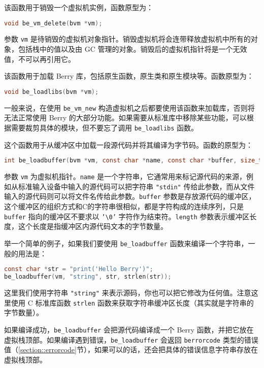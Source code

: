 
该函数用于销毁一个虚拟机实例，函数原型为：
\begin{lstlisting}[language=c, style=berry, numbers=none]
void be_vm_delete(bvm *vm);
\end{lstlisting}
参数 \texttt{vm} 是待销毁的虚拟机对象指针。销毁虚拟机将会连带释放虚拟机中所有的对象，包括栈中的值以及由 GC 管理的对象。销毁后的虚拟机指针将是一个无效值，不可以再引用它。


该函数用于加载 Berry 库，包括原生函数，原生类和原生模块等。函数原型为：
\begin{lstlisting}[language=c, style=berry, numbers=none]
void be_loadlibs(bvm *vm);
\end{lstlisting}
一般来说，在使用 \texttt{be\_vm\_new} 构造虚拟机之后都要使用该函数来加载库，否则将无法正常使用 Berry 的大部分功能。如果需要从标准库中移除某些功能，可以根据需要裁剪具体的模块，但不要忘了调用 \texttt{be\_loadlibs} 函数。


这个函数用于从缓冲区中加载一段源代码并将其编译为字节码。函数的原型为：
\begin{lstlisting}[language=c, style=berry, numbers=none]
int be_loadbuffer(bvm *vm, const char *name, const char *buffer, size_t length);
\end{lstlisting}
参数 \texttt{vm} 为虚拟机指针。\texttt{name} 是一个字符串，它通常用来标记源代码的来源，例如从标准输入设备中输入的源代码可以把字符串 \texttt{"stdin"} 传给此参数，而从文件输入的源代码则可以将文件名传给此参数。\texttt{buffer} 参数是存放源代码的缓冲区，这个缓冲区的组织方式和C的字符串很相似，都是字符构成的连续序列，只是 \texttt{buffer} 指向的缓冲区不要求以 \texttt{'\textbackslash 0'} 字符作为结束符。\texttt{length} 参数表示缓冲区长度，这个长度是指缓冲区内源代码文本的字节数量。

举一个简单的例子，如果我们要使用 \texttt{be\_loadbuffer} 函数来编译一个字符串，一般的用法是：
\begin{lstlisting}[language=c, style=berry, numbers=none]
const char *str = "print('Hello Berry')";
be_loadbuffer(vm, "string", str, strlen(str));
\end{lstlisting}
这里我们使用字符串 \texttt{"string"} 来表示源码，你也可以把它修改为任何值。注意这里使用 C 标准库函数 \texttt{strlen} 函数来获取字符串缓冲区长度（其实就是字符串的字节数量）。

如果编译成功，\texttt{be\_loadbuffer} 会把源代码编译成一个 Berry 函数，并把它放在虚拟栈顶部。如果编译遇到错误，\texttt{be\_loadbuffer} 会返回 \texttt{berrorcode} 类型的错误值（\ref{section::errorcode}节），如果可以的话，还会把具体的错误信息字符串存放在虚拟栈顶部。

